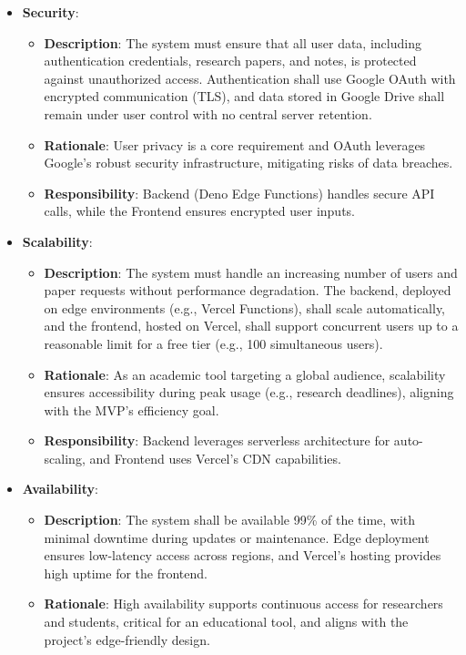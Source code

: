 \documentclass[12pt]{article}
\begin{document}
\begin{itemize}
  \item \textbf{Security}:
    \begin{itemize}
      \item \textbf{Description}: The system must ensure that all user data, including authentication credentials, research papers, and notes, is protected against unauthorized access. Authentication shall use Google OAuth with encrypted communication (TLS), and data stored in Google Drive shall remain under user control with no central server retention.
      \item \textbf{Rationale}: User privacy is a core requirement and OAuth leverages Google's robust security infrastructure, mitigating risks of data breaches.
      \item \textbf{Responsibility}: Backend (Deno Edge Functions) handles secure API calls, while the Frontend ensures encrypted user inputs.
    \end{itemize}
  \item \textbf{Scalability}:
    \begin{itemize}
      \item \textbf{Description}: The system must handle an increasing number of users and paper requests without performance degradation. The backend, deployed on edge environments (e.g., Vercel Functions), shall scale automatically, and the frontend, hosted on Vercel, shall support concurrent users up to a reasonable limit for a free tier (e.g., 100 simultaneous users).
      \item \textbf{Rationale}: As an academic tool targeting a global audience, scalability ensures accessibility during peak usage (e.g., research deadlines), aligning with the MVP's efficiency goal.
      \item \textbf{Responsibility}: Backend leverages serverless architecture for auto-scaling, and Frontend uses Vercel's CDN capabilities.
    \end{itemize}
  \item \textbf{Availability}:
    \begin{itemize}
      \item \textbf{Description}: The system shall be available 99\% of the time, with minimal downtime during updates or maintenance. Edge deployment ensures low-latency access across regions, and Vercel's hosting provides high uptime for the frontend.
      \item \textbf{Rationale}: High availability supports continuous access for researchers and students, critical for an educational tool, and aligns with the project's edge-friendly design.

\end{itemize}
\end{itemize}
\end{document}
